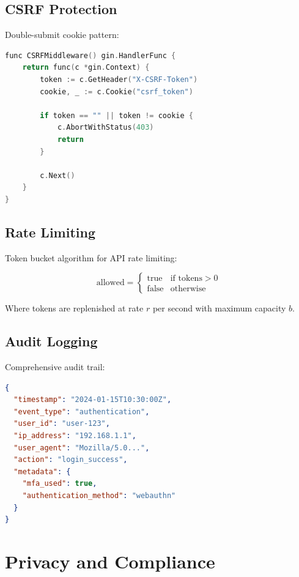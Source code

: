 \documentclass[11pt,a4paper]{article}
\begin{document}
\subsection{CSRF Protection}

Double-submit cookie pattern:

\begin{lstlisting}[language=C]
func CSRFMiddleware() gin.HandlerFunc {
    return func(c *gin.Context) {
        token := c.GetHeader("X-CSRF-Token")
        cookie, _ := c.Cookie("csrf_token")

        if token == "" || token != cookie {
            c.AbortWithStatus(403)
            return
        }

        c.Next()
    }
}
\end{lstlisting}

\subsection{Rate Limiting}

Token bucket algorithm for API rate limiting:

\begin{equation}
    \text{allowed} = \begin{cases}
        \text{true} & \text{if } \text{tokens} > 0 \\
        \text{false} & \text{otherwise}
    \end{cases}
\end{equation}

Where tokens are replenished at rate $r$ per second with maximum capacity $b$.

\subsection{Audit Logging}

Comprehensive audit trail:

\begin{lstlisting}[language=json]
{
  "timestamp": "2024-01-15T10:30:00Z",
  "event_type": "authentication",
  "user_id": "user-123",
  "ip_address": "192.168.1.1",
  "user_agent": "Mozilla/5.0...",
  "action": "login_success",
  "metadata": {
    "mfa_used": true,
    "authentication_method": "webauthn"
  }
}
\end{lstlisting}

\section{Privacy and Compliance}
\end{document}
